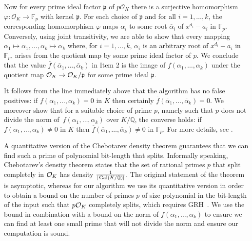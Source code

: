  
     Now for every prime ideal factor $\mathfrak{p}$ of $p\mathcal{O}_K$ there is a
surjective homomorphism $\varphi: \mathcal{O}_K \rightarrow \mathbb{F}_p$ with kernel
$\mathfrak{p}$.   For each choice of $\mathfrak{p}$ and for all $i=1,\ldots,k$, the corresponding homomorphism 
$\varphi$ maps $\alpha_i$ to some root $\overline{\alpha}_i$ of $x^{d_i} - a_i$ in $\mathbb{F}_p$.
Conversely, using joint transitivity, we are able to show that every
mapping $\alpha_1 \mapsto \overline{\alpha}_1, \ldots, \alpha_k \mapsto \overline{\alpha}_k$
where, for $i=1,\ldots,k$, $\overline{\alpha}_i$ is an arbitrary root of $x^{d_i} - a_i$ in $\mathbb{F}_p$,
arises from the quotient map by some prime ideal factor of $p$.
We conclude that the value $\overline{f}(\overline{\alpha}_1,\ldots,\overline{\alpha}_k)$ in Item 2 is 
the image of $f(\alpha_1,\ldots,\alpha_k)$ under the quotient map $\mathcal{O}_K \to \mathcal{O}_K / \mathfrak{p}$ for some prime ideal $\mathfrak{p}$.
    
    It follows from the line immediately above that
    the algorithm has no false positives: if $f(\alpha_1,\ldots,\alpha_k)=0$ in $K$ then certainly 
    $\overline{f}(\overline{\alpha}_1,\ldots,\overline{\alpha}_k)= 0$.
    We moreover show that for a suitable choice of prime $p$, namely such that $p$ does not
    divide the norm of~$f(\alpha_1,\ldots,\alpha_k)$ over $K/\mathbb{Q}$,
    the converse holds:
    if $f(\alpha_1,\ldots,\alpha_k)\neq 0$ in $K$
    then
    $\overline{f}(\overline{\alpha}_1,\ldots,\overline{\alpha}_k)\neq 0$
    in $\mathbb{F}_p$.
For more details, see .

A quantitative version of the Chebotarev density theorem
guarantees that we can find such a prime of polynomial bit-length that splits.
Informally speaking, Chebotarev's density theorem states that the set of rational primes $p$ that split completely in $\mathcal{O}_K$ has density $\frac{1}{|\operatorname{Gal}(K/\mathbb{Q})|}$.
The original statement of the theorem~\cite{Stevenhagen95chebotarevand}
is asymptotic, whereas for our algorithm we use its quantitative version in order to obtain a bound on the number of primes $p$ of size polynomial in the bit-length of the input such that $p\mathcal{O}_K$ completely splits, which requires GRH~\cite{lagariasO, serre1981quelques}.
We use the bound in combination with a bound on the norm of $f(\alpha_1,\ldots,\alpha_k)$ to ensure we can find at least one small prime that will not divide the norm and ensure our computation is sound.


